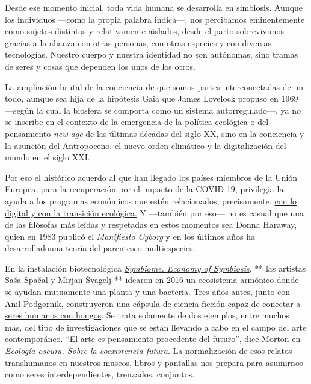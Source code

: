 Desde ese momento inicial, toda vida humana se desarrolla en simbiosis.
Aunque los individuos ---como la propia palabra indica---, nos
percibamos eminentemente como sujetos distintos y relativamente
aislados, desde el parto sobrevivimos gracias a la alianza con otras
personas, con otras especies y con diversas tecnologías. Nuestro cuerpo
y nuestra identidad no son autónomas, sino tramas de seres y cosas que
dependen los unos de los otros.

La ampliación brutal de la conciencia de que somos partes
interconectadas de un todo, aunque sea hija de la hipótesis Gaia que
James Lovelock propuso en 1969 ---según la cual la biosfera se comporta
como un sistema autorregulado---, ya no se inscribe en el contexto de la
emergencia de la política ecológica o del pensamiento \emph{new age} de
las últimas décadas del siglo XX, sino en la conciencia y la asunción
del Antropoceno, el nuevo orden climático y la digitalización del mundo
en el siglo XXI.

Por eso el histórico acuerdo al que han llegado los países miembros de
la Unión Europea, para la recuperación por el impacto de la COVID-19,
privilegia la ayuda a los programas económicos que estén relacionados,
precisamente,
\href{http://www.fondos.ciencia.gob.es/portal/site/fondos/menuitem.e1bc720d51edb26fc2b33510026041a0/?vgnextoid=de287d7f3858c610VgnVCM1000001d04140aRCRD}{con
lo digital y con la transición ecológica.} Y ---también por eso--- no es
casual que una de las filósofas más leídas y respetadas en estos
momentos sea Donna Haraway, quien en 1983 publicó el \emph{Manifiesto
Cyborg} y en los últimos años ha
desarrollado\href{https://www.consonni.org/es/publicacion/seguir-con-el-problema-generar-parientes-en-el-chthuluceno}{una
teoría del parentesco multiespecies}.

En la instalación biotecnológica
\href{https://www.agapea.si/en/projects/symbiome-the-economy-of-symbiosis}{\emph{Symbiome.
Economy of Symbiosis}}, ** las artistas Saša Spačal y Mirjan Švagelj **
idearon en 2016 un ecosistema armónico donde se ayudan mutuamente una
planta y una bacteria. Tres años antes, junto con Anil Podgornik,
construyeron \href{https://www.agapea.si/en/projects/myconnect}{una
cápsula de ciencia ficción capaz de conectar a seres humanos con
hongos}. Se trata solamente de dos ejemplos, entre muchos más, del tipo
de investigaciones que se están llevando a cabo en el campo del arte
contemporáneo. ``El arte es pensamiento procedente del futuro'', dice
Morton en
\href{https://www.planetadelibros.com/libro-ecologia-oscura/295794}{\emph{Ecología
oscura. Sobre la coexistencia futura}}. La normalización de esos relatos
transhumanos en nuestros museos, libros y pantallas nos prepara para
asumirnos como seres interdependientes, trenzados, conjuntos.

